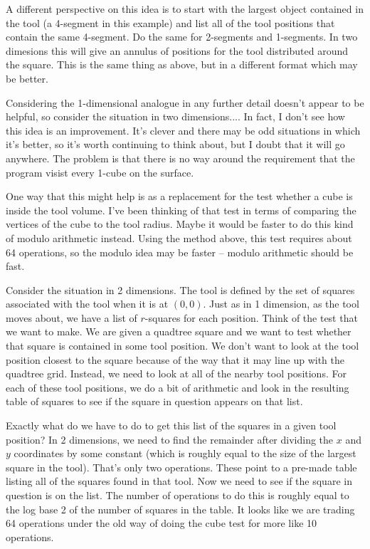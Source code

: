 \documentclass[titlepage,oneside,10pt]{article}
\begin{document}
A different perspective on this idea is to start with the largest
object contained in the tool (a 4-segment in this example) and list
all of the tool positions that contain the same 4-segment. Do the same
for 2-segments and 1-segments. In two dimesions this will give an
annulus of positions for the tool distributed around the square. This
is the same thing as above, but in a different format which may be better.

Considering the 1-dimensional analogue in any further detail doesn't
appear to be helpful, so consider the situation in two
dimensions.... In fact, I don't see how this idea is an
improvement. It's clever and there may be odd situations in which it's
better, so it's worth continuing to think about, but I doubt that it
will go anywhere. The problem is that there is no way around the
requirement that the program visist every 1-cube on the surface.

One way that this might help is as a replacement for the test whether
a cube is inside the tool volume. I've been thinking of that test in
terms of comparing the vertices of the cube to the tool radius. Maybe
it would be faster to do this kind of modulo arithmetic instead. Using the
method above, this test requires about 64 operations, so the modulo idea may
be faster -- modulo arithmetic should be fast.

Consider the situation in 2 dimensions. The tool is defined by the set
of squares associated with the tool when it is at $(0,0)$. Just as in
1 dimension, as the tool moves about, we have a list of $r$-squares
for each position. Think of the test that we want to make. We are
given a quadtree square and we want to test whether that square is
contained in some tool position. We don't want to look at the tool
position closest to the square because of the way that it may line up
with the quadtree grid. Instead, we need to look at all of the nearby
tool positions. For each of these tool positions, we do a bit of
arithmetic and look in the resulting table of squares to see if the
square in question appears on that list.

Exactly what do we have to do to get this list of the squares in a
given tool position? In 2 dimensions, we need to find the remainder
after dividing the $x$ and $y$ coordinates by some constant (which is roughly
equal to the size of the largest square in the tool). That's only two
operations. These point to a pre-made table listing all of the squares
found in that tool. Now we need to see if the square in question is on
the list. The number of operations to do this is roughly equal to the
log base 2 of the number of squares in the table. It looks like we are
trading 64 operations under the old way of doing the cube test for more
like 10 operations.
\end{document}
